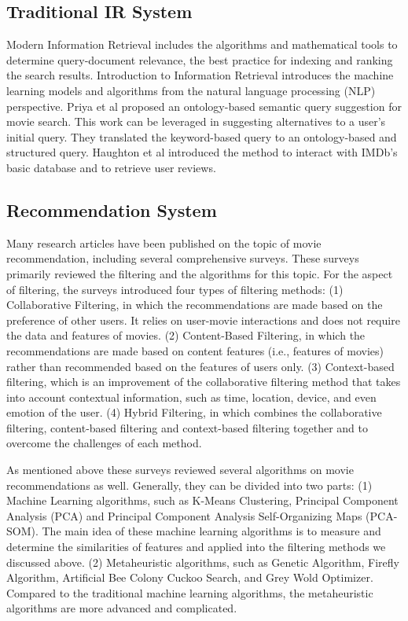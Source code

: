 \documentclass[journal]{IEEEtran}
\theoremstyle{mydefstyle}
\begin{document}
\subsection{Traditional IR System}
Modern Information Retrieval\cite{RN15} includes the algorithms and mathematical tools to determine query-document relevance, the best practice for indexing and ranking the search results. Introduction to Information Retrieval\cite{manning2008introduction} introduces the machine learning models and algorithms from the natural language processing (NLP) perspective. Priya et al\cite{6508326} proposed an ontology-based semantic query suggestion for movie search. This work can be leveraged in suggesting alternatives to a user’s initial query. They translated the keyword-based query to an ontology-based and structured query. Haughton et al\cite{RN16} introduced the method to interact with IMDb’s basic database and to retrieve user reviews. 

\subsection{Recommendation System}
Many research articles have been published on the topic of movie recommendation, including several comprehensive surveys\cite{RN19}. These surveys primarily reviewed the filtering and the algorithms for this topic. For the aspect of filtering, the surveys introduced four types of filtering methods: (1) Collaborative Filtering, in which the recommendations are made based on the preference of other users. It relies on user-movie interactions and does not require the data and features of movies. (2) Content-Based Filtering, in which the recommendations are made based on content features (i.e., features of movies) rather than recommended based on the features of users only. (3) Context-based filtering, which is an improvement of the collaborative filtering method that takes into account contextual information, such as time, location, device, and even emotion of the user. (4) Hybrid Filtering, in which combines the collaborative filtering, content-based filtering and context-based filtering together and to overcome the challenges of each method.

As mentioned above these surveys reviewed several algorithms on movie recommendations as well. Generally, they can be divided into two parts: (1) Machine Learning algorithms, such as K-Means Clustering, Principal Component Analysis (PCA) and Principal Component Analysis Self-Organizing Maps (PCA-SOM). The main idea of these machine learning algorithms is to measure and determine the similarities of features and applied into the filtering methods we discussed above. (2) Metaheuristic algorithms, such as Genetic Algorithm, Firefly Algorithm, Artificial Bee Colony Cuckoo Search, and Grey Wold Optimizer. Compared to the traditional machine learning algorithms, the metaheuristic algorithms are more advanced and complicated.
\end{document}
